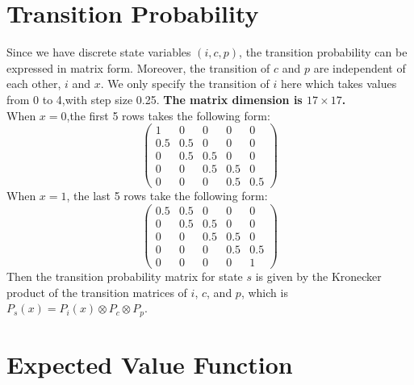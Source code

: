 \documentclass[12pt]{article}[margin=1in]
\begin{document}
\section{Transition Probability}
Since we have discrete state variables $(i,c,p)$, the transition probability
can be expressed in matrix form. Moreover, the transition of $c$ and $p$ are
independent of each other, $i$ and $x$. We only specify the transition of $i$
here which takes values from 0 to 4,with step size 0.25. \textbf{The matrix
    dimension is $17 \times 17$.} \\ When $x = 0$,the first 5 rows takes the
following form:
\begin{equation}\label{eq:trans0}
    \begin{pmatrix}
        1   & 0   & 0   & 0   & 0   \\
        0.5 & 0.5 & 0   & 0   & 0   \\
        0   & 0.5 & 0.5 & 0   & 0   \\
        0   & 0   & 0.5 & 0.5 & 0   \\
        0   & 0   & 0   & 0.5 & 0.5
    \end{pmatrix}
\end{equation}
When $x = 1$, the last 5 rows take the following form:
\begin{equation}\label{eq:trans1}
    \begin{pmatrix}
        0.5 & 0.5 & 0   & 0   & 0   \\
        0   & 0.5 & 0.5 & 0   & 0   \\
        0   & 0   & 0.5 & 0.5 & 0   \\
        0   & 0   & 0   & 0.5 & 0.5 \\
        0   & 0   & 0   & 0   & 1
    \end{pmatrix}
\end{equation}
Then the transition probability matrix for state $s$ is given by the Kronecker product of the transition matrices of $i$, $c$, and $p$, which is $P_s(x) = P_i(x) \otimes P_c \otimes P_p$.
\section{Expected Value Function}
\end{document}

